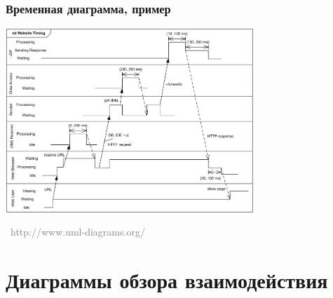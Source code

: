 \documentclass[xetex,mathserif,serif]{beamer}
\newcommand{\attribution}[1] {
	\vspace{-5mm}\begin{flushright}\begin{scriptsize}\textcolor{gray}{\textcopyright\, #1}\end{scriptsize}\end{flushright}
}
\begin{document}
	\begin{frame}
		\frametitle{Временная диаграмма, пример}
		\begin{center}
			\includegraphics[width=0.7\textwidth]{timingDiagramExample.png}
			\attribution{http://www.uml-diagrams.org/}
		\end{center}
	\end{frame}

	\section{Диаграммы обзора взаимодействия}
\end{document}
